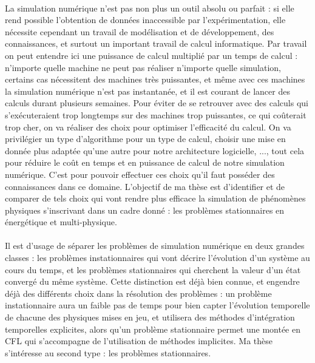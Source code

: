 		\paragraph{} La simulation numérique n'est pas non plus un outil absolu ou parfait : si elle rend possible l'obtention de données inaccessible par l'expérimentation, elle nécessite cependant un travail de modélisation et de développement, des connaissances, et surtout un important travail de calcul informatique.
		Par travail on peut entendre ici une puissance de calcul multiplié par un temps de calcul : n'importe quelle machine ne peut pas réaliser n'importe quelle simulation, certains cas nécessitent des machines très puissantes, et même avec ces machines la simulation numérique n'est pas instantanée, et il est courant de lancer des calculs durant plusieurs semaines.
		Pour éviter de se retrouver avec des calculs qui s'exécuteraient trop longtemps sur des machines trop puissantes, ce qui coûterait trop cher, on va réaliser des choix pour optimiser l'efficacité du calcul.
		On va privilégier un type d'algorithme pour un type de calcul, choisir une mise en donnée plus adaptée qu'une autre pour notre architecture logicielle, ..., tout cela pour réduire le coût en temps et en puissance de calcul de notre simulation numérique.
		C'est pour pouvoir effectuer ces choix qu'il faut posséder des connaissances dans ce domaine.
		L'objectif de ma thèse est d'identifier et de comparer de tels choix qui vont rendre plus efficace la simulation de phénomènes physiques s'inscrivant dans un cadre donné : les problèmes stationnaires en énergétique et multi-physique.

		\paragraph{} Il est d'usage de séparer les problèmes de simulation numérique en deux grandes classes : les problèmes instationnaires qui vont décrire l'évolution d'un système au cours du temps, et les problèmes stationnaires qui cherchent la valeur d'un état convergé du même système.
		Cette distinction est déjà bien connue, et engendre déjà des différents choix dans la résolution des problèmes : un problème instationnaire aura un faible pas de temps pour bien capter l'évolution temporelle de chacune des physiques mises en jeu, et utilisera des méthodes d'intégration temporelles explicites, alors qu'un problème stationnaire permet une montée en CFL qui s'accompagne de l'utilisation de méthodes implicites.
		Ma thèse s'intéresse au second type : les problèmes stationnaires.


